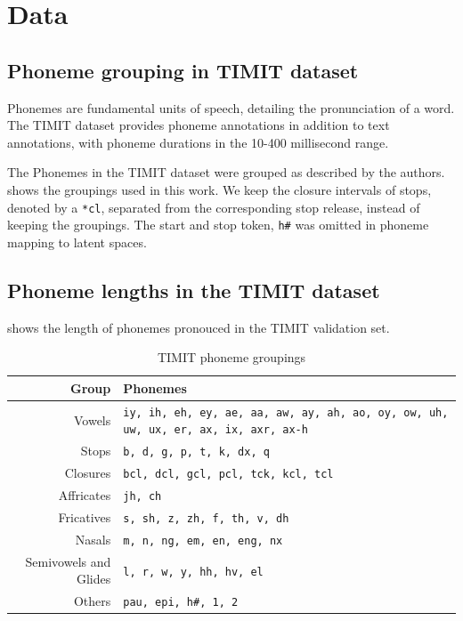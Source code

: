 \section{Data}\label{appx:data}

\subsection{Phoneme grouping in TIMIT dataset}\label{appx:timit-phonemes}
Phonemes are fundamental units of speech, detailing the pronunciation of a word.
The TIMIT dataset provides phoneme annotations in addition to text annotations, with phoneme durations in the 10-400 millisecond range. 
\cite{astolfi_duration_2015}

The Phonemes in the TIMIT dataset were grouped as described by the authors.
\cite{garofolo_john_s_timit_1993}
 shows the groupings used in this work.
We keep the closure intervals of stops, denoted by a \texttt{*cl}, separated from the corresponding stop release, instead of keeping the groupings. 
The start and stop token, \texttt{h\#} was omitted in phoneme mapping to latent spaces.

\subsection{Phoneme lengths in the TIMIT dataset}\label{appx:timit-phoneme-duration}
 shows the length of phonemes pronouced in the TIMIT validation set. 




\begin{table}[htb]
    \centering
    \begin{tabular}{r|p{8cm}}
        Group & Phonemes \\
        \hline
        Vowels & \texttt{iy, ih, eh, ey, ae, aa, aw, ay, ah, ao, oy, ow, uh, uw, ux, er, ax, ix, axr, ax-h} \\
        Stops & \texttt{b, d, g, p, t, k, dx, q} \\
        Closures & \texttt{bcl, dcl, gcl, pcl, tck, kcl, tcl} \\
        Affricates & \texttt{jh, ch} \\
        Fricatives & \texttt{s, sh, z, zh, f, th, v, dh} \\
        Nasals & \texttt{m, n, ng, em, en, eng, nx} \\
        Semivowels and Glides & \texttt{l, r, w, y, hh, hv, el} \\
        Others & \texttt{pau, epi, h\#, 1, 2} \\ 
    \end{tabular}
    \caption{TIMIT phoneme groupings}
    \label{tab:timit-phonemes}
\end{table}


